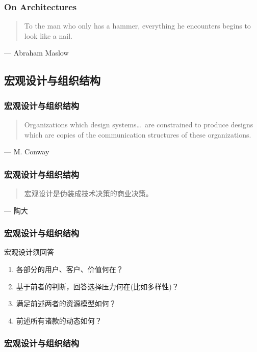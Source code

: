 \documentclass[UTF8,lualatex]{ctexbeamer}
\newcommand{\pagequote}[2]{
  \Large
  \begin{quotation}
      #1
  \end{quotation}
  \flushright\normalsize --- {#2}
}
\begin{document}
\begin{frame}
    \frametitle{On Architectures}
    \pagequote{To the man who only has a hammer, everything he encounters begins to look like a nail.}{Abraham Maslow}
\end{frame}


\subsection{宏观设计与组织结构}

\begin{frame}
    \frametitle{宏观设计与组织结构}
    \pagequote{
        Organizations which design systems\ldots~are constrained to produce designs
        which are copies of the communication structures of these organizations.}
        {M. Conway}
\end{frame}

\begin{frame}
    \frametitle{宏观设计与组织结构}
    \pagequote{宏观设计是伪装成技术决策的商业决策。}{陶大}
\end{frame}

\begin{frame}
    \frametitle{宏观设计与组织结构}
    \begin{block}{宏观设计须回答}
        \begin{enumerate}
            \item 各部分的用户、客户、价值何在？
            \item 基于前者的判断，回答选择压力何在(比如多样性)？
            \item 满足前述两者的资源模型如何？
            \item 前述所有诸款的动态如何？
        \end{enumerate}
    \end{block}
\end{frame}

\begin{frame}
    \frametitle{宏观设计与组织结构}
\end{frame}
\end{document}
